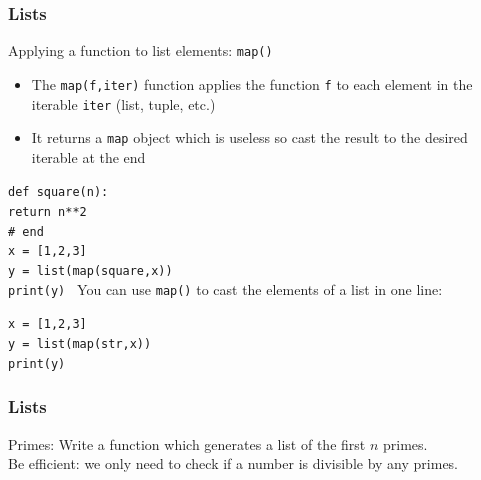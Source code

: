 \documentclass{beamer}
\newcommand{\code}[1]{\texttt{#1}}
\newcommand{\tab}{\hspace*{22pt}}
\begin{document}
\begin{frame}%
	\frametitle{Lists}
	
	\begin{block}{Applying a function to list elements: \code{map()}}
		\begin{itemize}
			\item The \code{map(f,iter)} function applies the function \code{f} to each element in the iterable \code{iter} (list, tuple, etc.)
			\item It returns a \code{map} object which is useless so cast the result to the desired iterable at the end
		\end{itemize}
		
		\vspace{10pt}
			\code{def square(n): \\
					\tab return n**2 \\
					\# end \\
					x = [1,2,3] \\
					y = list(map(square,x)) \\
					print(y) 
					}
		\endminipage\hfill
			You can use \code{map()} to cast the elements of a list in one line:
			
			\vspace{10pt}
			\code{x = [1,2,3] \\
					y = list(map(str,x)) \\
					print(y) 
					}
		\endminipage\hfill
	\end{block}
	
\end{frame}

\begin{frame}%
	\frametitle{Lists}
	
	\begin{exampleblock}{Primes:}
		Write a function which generates a list of the first $n$ primes. \\
		Be efficient: we only need to check if a number is divisible by any primes.
	\end{exampleblock}
	
\end{frame}
\end{document}
